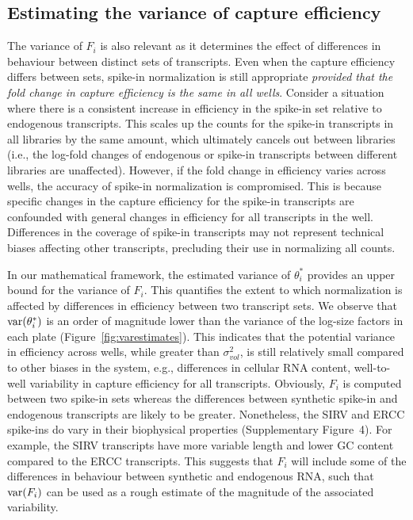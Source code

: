 \documentclass{article}
\newcommand{\suppfigbiophys}{4}
\begin{document}
\subsection{Estimating the variance of capture efficiency}
The variance of $F_i$ is also relevant as it determines the effect of differences in behaviour between distinct sets of transcripts.
Even when the capture efficiency differs between sets, spike-in normalization is still appropriate \textit{provided that the fold change in capture efficiency is the same in all wells}.
Consider a situation where there is a consistent increase in efficiency in the spike-in set relative to endogenous transcripts.
This scales up the counts for the spike-in transcripts in all libraries by the same amount, which ultimately cancels out between libraries (i.e., the log-fold changes of endogenous or spike-in transcripts between different libraries are unaffected).
However, if the fold change in efficiency varies across wells, the accuracy of spike-in normalization is compromised.
This is because specific changes in the capture efficiency for the spike-in transcripts are confounded with general changes in efficiency for all transcripts in the well.
Differences in the coverage of spike-in transcripts may not represent technical biases affecting other transcripts, precluding their use in normalizing all counts.

In our mathematical framework, the estimated variance of $\theta^*_i$ provides an upper bound for the variance of $F_i$.
This quantifies the extent to which normalization is affected by differences in efficiency between two transcript sets.
We observe that $\mbox{var}(\theta^*_i)$ is an order of magnitude lower than the variance of the log-size factors in each plate (Figure~\ref{fig:varestimates}).
This indicates that the potential variance in efficiency across wells, while greater than $\sigma^2_{vol}$, is still relatively small compared to other biases in the system, e.g., differences in cellular RNA content, well-to-well variability in capture efficiency for all transcripts.
Obviously, $F_i$ is computed between two spike-in sets whereas the differences between synthetic spike-in and endogenous transcripts are likely to be greater.
Nonetheless, the SIRV and ERCC spike-ins do vary in their biophysical properties (Supplementary Figure~\suppfigbiophys{}).
For example, the SIRV transcripts have more variable length and lower GC content compared to the ERCC transcripts.
This suggests that $F_i$ will include some of the differences in behaviour between synthetic and endogenous RNA, such that $\mbox{var}(F_i)$ can be used as a rough estimate of the magnitude of the associated variability.
\end{document}
